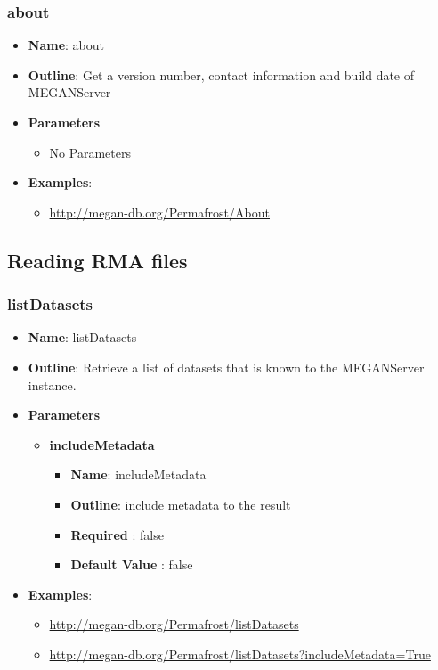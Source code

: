 \documentclass[11pt]{article}
\begin{document}
\subsubsection{about}

\begin{itemize}
	\item \textbf{Name}: about
	\item \textbf{Outline}: Get a version number, contact information and build date of MEGANServer
	\item \textbf{Parameters}
		\begin{itemize}
			\item No Parameters
		\end{itemize}
	\item \textbf{Examples}:
		\begin{itemize}	
			\item \url{http://megan-db.org/Permafrost/About}
		\end{itemize}
\end{itemize}

\subsection{Reading RMA files}

\subsubsection{listDatasets}
\begin{itemize}
	\item \textbf{Name}: listDatasets
	\item \textbf{Outline}: Retrieve a list of datasets that is known to the MEGANServer instance.
	\item \textbf{Parameters}
		\begin{itemize}
			\item \textbf{includeMetadata}		
				\begin{itemize}
					\item \textbf{Name}: includeMetadata
					\item \textbf{Outline}: include metadata to the result
					\item \textbf{Required} : false
					\item \textbf{Default Value} : false
				\end{itemize}
		\end{itemize}
	\item \textbf{Examples}:
		\begin{itemize}
			\item \url{http://megan-db.org/Permafrost/listDatasets}			
			\item \url{http://megan-db.org/Permafrost/listDatasets?includeMetadata=True}
		\end{itemize}
\end{itemize}
\end{document}
